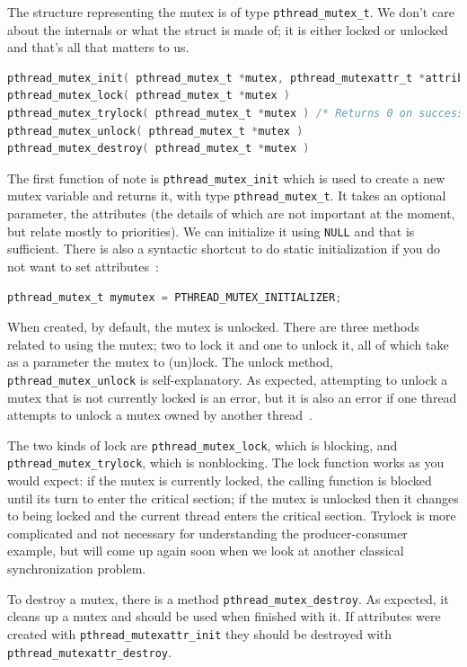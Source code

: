 \documentclass[a4paper]{report}
\begin{document}
\begin{appendices}
The structure representing the mutex is of type \texttt{pthread\_mutex\_t}. We don't care about the internals or what the struct is made of; it is either locked or unlocked and that's all that matters to us.

\begin{lstlisting}[language=C]
pthread_mutex_init( pthread_mutex_t *mutex, pthread_mutexattr_t *attributes )
pthread_mutex_lock( pthread_mutex_t *mutex )
pthread_mutex_trylock( pthread_mutex_t *mutex ) /* Returns 0 on success */
pthread_mutex_unlock( pthread_mutex_t *mutex )
pthread_mutex_destroy( pthread_mutex_t *mutex )
\end{lstlisting}

The first function of note is \texttt{pthread\_mutex\_init} which is used to create a new mutex variable and returns it, with type \texttt{pthread\_mutex\_t}. It takes an optional parameter, the attributes (the details of which are not important at the moment, but relate mostly to priorities). We can initialize it using \texttt{NULL} and that is sufficient. There is also a syntactic shortcut to do static initialization if you do not want to set attributes~\cite{pthreads}: 

\begin{lstlisting}[language=C]
pthread_mutex_t mymutex = PTHREAD_MUTEX_INITIALIZER;
\end{lstlisting}

When created, by default, the mutex is unlocked. There are three methods related to using the mutex; two to lock it and one to unlock it, all of which take as a parameter the mutex to (un)lock. The unlock method, \texttt{pthread\_mutex\_unlock} is self-explanatory. As expected, attempting to unlock a mutex that is not currently locked is an error, but it is also an error if one thread attempts to unlock a mutex owned by another thread~\cite{pthreads}.

The two kinds of lock are \texttt{pthread\_mutex\_lock}, which is blocking, and \texttt{pthread\_mutex\_trylock}, which is nonblocking. The lock function works as you would expect: if the mutex is currently locked, the calling function is blocked until its turn to enter the critical section; if the mutex is unlocked then it changes to being locked and the current thread enters the critical section. Trylock is more complicated and not necessary for understanding the producer-consumer example, but will come up again soon when we look at another classical synchronization problem.

To destroy a mutex, there is a method \texttt{pthread\_mutex\_destroy}. As expected, it cleans up a mutex and should be used when finished with it. If attributes were created with \texttt{pthread\_mutexattr\_init} they should be destroyed with \texttt{pthread\_mutexattr\_destroy}.


\end{appendices}
\end{document}
